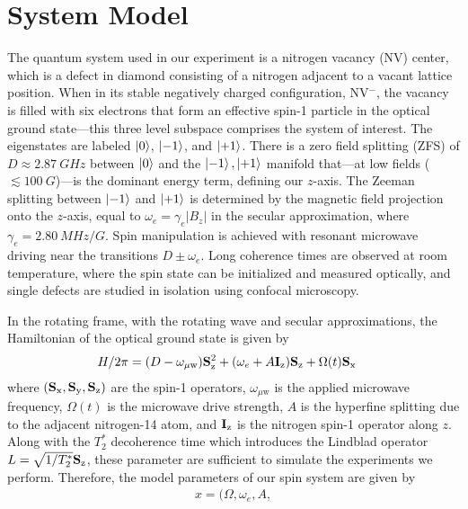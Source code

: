 \documentclass[aps,nofootinbib,prl,twocolumn,superscriptaddress]{revtex4}
\newcommand{\mps}{x}
\renewcommand{\H}{H}
\newcommand{\uw}{{\mu\text{w}}}
\begin{document}
\section{System Model}
\label{sec:system-model}

The quantum system used in our experiment is a nitrogen vacancy (NV) center,
which is a defect in diamond consisting of a nitrogen adjacent to 
a vacant lattice position.
When in its stable negatively charged configuration, NV$^-$, 
the vacancy is filled with
six electrons that form an effective spin-1 particle in the optical
ground state---this three level subspace comprises the system of interest.
The eigenstates are labeled $\ket{0}$, $\ket{-1}$, and $\ket{+1}$.
There is a zero field splitting (ZFS) of $D\approx\SI{2.87}{GHz}$ 
between $\ket{0}$ and the $\ket{-1},\ket{+1}$ manifold 
that---at low fields ($\lesssim\SI{100}{G}$)---is the dominant energy term,
defining our $z$-axis.
The Zeeman splitting between $\ket{-1}$ and $\ket{+1}$ is determined by
the magnetic field projection onto the $z$-axis, equal to
$\omega_e=\gamma_e |B_z|$ in the secular approximation, 
where $\gamma_e=\SI{2.80}{MHz/G}$.
Spin manipulation is achieved with resonant microwave driving near
the transitions $D\pm\omega_e$.
Long coherence times are observed at room temperature, where
the spin state can be initialized and measured optically, and single 
defects are studied in isolation using confocal microscopy.

In the rotating frame, with the rotating wave and secular approximations,
the Hamiltonian of the optical ground state is given by
\begin{align}
    \H/2\pi &= (D-\omega_\uw)\Sz^2 + (\omega_e+A \Iz)\Sz + \Omega(t)\Sx
\end{align}
where $(\mathbf{S}_{\text{x}},\mathbf{S}_{\text{y}},\mathbf{S}_{\text{z}})$ are the spin-1 operators, $\omega_\uw$ is the applied
microwave frequency, $\Omega(t)$ is the microwave drive strength, $A$ is
the hyperfine splitting  due to the adjacent nitrogen-14 atom, and $\mathbf{I}_{\text{z}}$
is the nitrogen spin-1 operator along $z$.
Along with the $T_2^*$ decoherence time which introduces the 
Lindblad operator $L=\sqrt{1/T_2^*}\mathbf{S}_{\text{z}}$, these parameter are sufficient
to simulate the experiments we perform.
Therefore, the model parameters of our spin system are given by
\begin{align}
    \mps=(\Omega,\omega_e,A,
\end{align}
\end{document}
